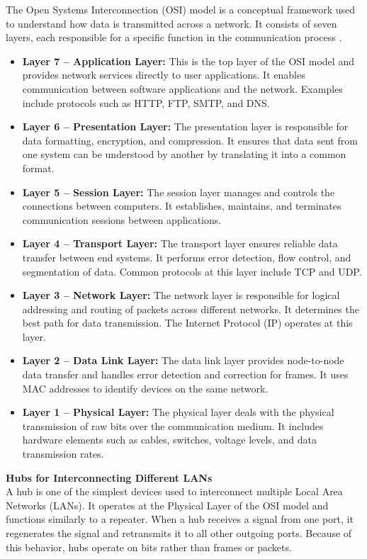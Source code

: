 \documentclass[a4paper,12pt]{article}
\begin{document}
\noindent
The Open Systems Interconnection (OSI) model is a conceptual framework used to understand how data is transmitted across a network. It consists of seven layers, each responsible for a specific function in the communication process \cite{gfg_osi_model}.
\begin{itemize}
    \item \textbf{Layer 7 -- Application Layer:}  This is the top layer of the OSI model and provides network services directly to user applications. It enables communication between software applications and the network. Examples include protocols such as HTTP, FTP, SMTP, and DNS.
    \item \textbf{Layer 6 -- Presentation Layer:}  The presentation layer is responsible for data formatting, encryption, and compression. It ensures that data sent from one system can be understood by another by translating it into a common format.
    \item \textbf{Layer 5 -- Session Layer:}  The session layer manages and controls the connections between computers. It establishes, maintains, and terminates communication sessions between applications.
    \item \textbf{Layer 4 -- Transport Layer:} The transport layer ensures reliable data transfer between end systems. It performs error detection, flow control, and segmentation of data. Common protocols at this layer include TCP and UDP.
    \item \textbf{Layer 3 -- Network Layer:} The network layer is responsible for logical addressing and routing of packets across different networks. It determines the best path for data transmission. The Internet Protocol (IP) operates at this layer.
    \item \textbf{Layer 2 -- Data Link Layer:} The data link layer provides node-to-node data transfer and handles error detection and correction for frames. It uses MAC addresses to identify devices on the same network.
    \item \textbf{Layer 1 -- Physical Layer:} The physical layer deals with the physical transmission of raw bits over the communication medium. It includes hardware elements such as cables, switches, voltage levels, and data transmission rates.
\end{itemize}

\noindent
\textbf{Hubs for Interconnecting Different LANs} \\
\noindent
A hub is one of the simplest devices used to interconnect multiple Local Area Networks (LANs). It operates at the Physical Layer of the OSI model and functions similarly to a repeater. When a hub receives a signal from one port, it regenerates the signal and retransmits it to all other outgoing ports. Because of this behavior, hubs operate on bits rather than frames or packets.\\
\end{document}
